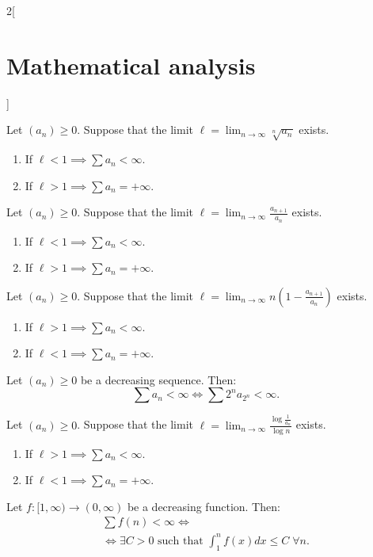 \documentclass[../../../main.tex]{subfiles}
\begin{document}
\begin{multicols}{2}[\section{Mathematical analysis}]
\begin{theorem}
\begin{enumerate}
\end{enumerate}
\end{theorem}
\begin{theorem}
Let $(a_n)\geq 0$. Suppose that the limit $\displaystyle \ell=\lim_{n\to\infty}\sqrt[n]{a_n}$ exists.
\begin{enumerate}
    \item If $\ell<1\implies\sum a_n<\infty$.
    \item If $\ell>1\implies\sum a_n=+\infty$.
\end{enumerate}
\end{theorem}
\begin{theorem}
Let $(a_n)\geq 0$. Suppose that the limit $\displaystyle \ell=\lim_{n\to\infty}\frac{a_{n+1}}{a_n}$ exists.
\begin{enumerate}
    \item If $\ell<1\implies\sum a_n<\infty$.
    \item If $\ell>1\implies\sum a_n=+\infty$.
\end{enumerate}
\end{theorem}
\begin{theorem}
Let $(a_n)\geq 0$. Suppose that the limit $\displaystyle \ell=\lim_{n\to\infty}n\left(1-\frac{a_{n+1}}{a_n}\right)$ exists.
\begin{enumerate}
    \item If $\ell>1\implies\sum a_n<\infty$.
    \item If $\ell<1\implies\sum a_n=+\infty$.
\end{enumerate}
\end{theorem}
\begin{theorem}
Let $(a_n)\geq 0$ be a decreasing sequence. Then: $$\textstyle\sum a_n<\infty\iff\sum 2^na_{2^n}<\infty.$$
\end{theorem}
\begin{theorem}
Let $(a_n)\geq 0$. Suppose that the limit $\displaystyle \ell=\lim_{n\to\infty}\frac{\log\frac{1}{a_n}}{\log n}$ exists.
\begin{enumerate}
    \item If $\ell>1\implies\sum a_n<\infty$.
    \item If $\ell<1\implies\sum a_n=+\infty$.
\end{enumerate}
\end{theorem}
\begin{theorem}\label{MA-inttest}
Let $f:[1,\infty)\rightarrow(0,\infty)$ be a decreasing function. Then:
\begin{multline*}
    \textstyle\sum f(n)<\infty\iff\\\displaystyle\iff\exists C>0\text{ such that }\int_1^nf(x)dx\leq C\;\forall n.
\end{multline*}
\end{theorem}

\end{multicols}
\end{document}
